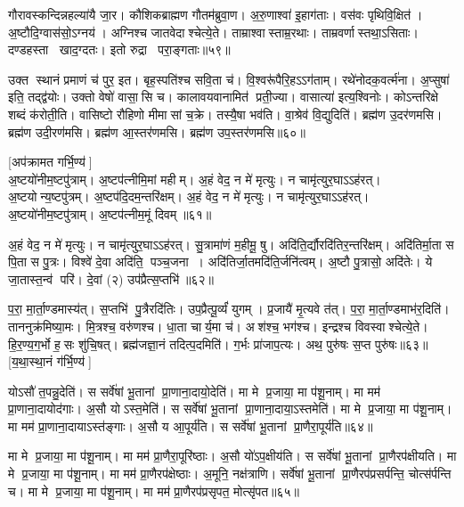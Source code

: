 गौरावस्कन्दिन्नहल्या॑यै जा॒र। कौशिकब्राह्मण गौतम॑ब्रुवा॒ण। 
अ॒रु॒णाश्वा॑ इ॒हाग॑ताः। वस॑वः पृथिवि॒क्षित॑। 
अ॒ष्टौदि॒ग्वास॑सो॒ऽग्नय॑। अग्निश्च जातवेदाश्चेत्ये॒ते। 
ताम्राश्वास्ताम्र॒रथाः। ताम्रवर्णास्तथा॒\-ऽसिताः। 
दण्डहस्ता खाद॒ग्दतः। इतो रुद्रा परा॒ङ्गताः॥५९॥


उक्त स्थानं प्रमाणं च॑ पुर॒ इत। बृह॒स्पति॑श्च सवि॒ता च॑। 
वि॒श्वरू॑पैरि॒हऽऽग॑ताम्‌। रथे॑नोदक॒वर्त्म॑ना। 
अ॒प्सुषा॑ इति॒ तद्द्व॑योः। उक्तो वेषो॑ वासा॒सि च। 
कालावयवानामित॑ प्रती॒ज्या। वासात्या॑ इत्य॒श्विनोः। 
कोऽन्तरिक्षे शब्दं क॑रोती॒ति। वासिष्टो रौहिणो मीमासां च॒क्रे। 
तस्यै॒षा भव॑ति। वा॒श्रेव॑ वि॒द्युदिति॑। 
ब्रह्म॑ण उ॒दर॑णमसि। ब्रह्म॑ण उदी॒रण॑मसि। 
ब्रह्म॑ण आ॒स्तर॑णमसि। ब्रह्म॑ण उप॒स्तर॑णमसि॥६०॥\anuvakamend


[अप॑क्रामत गर्भि॒ण्य॑]\\
अ॒ष्टयो॑नीम॒ष्टपु॑त्राम्‌। अ॒ष्टप॑त्नीमि॒मां महीम्‌। 
अ॒हं वेद॒ न मे॑ मृत्युः। न चामृ॑त्युर॒घाऽऽह॑रत्‌। 
अ॒ष्टयोन्य॒ष्टपु॑त्रम्‌। अ॒ष्टप॑दि॒दम॒न्तरि॑क्षम्‌। 
अ॒हं वेद॒ न मे॑ मृत्युः। न चामृ॑त्युर॒घाऽऽह॑रत्‌। 
अ॒ष्टयो॑नीम॒ष्टपु॑त्राम्‌। अ॒ष्टप॑त्नीम॒मूं दिवम्‌॥६१॥


अ॒हं वेद॒ न मे॑ मृत्युः। न चामृ॑त्युर॒घाऽऽह॑रत्‌। 
सु॒त्रामा॑णं म॒हीमू॒ षु। अदि॑ति॒र्द्यौरदि॑तिर॒न्तरि॑क्षम्। 
अदि॑तिर्मा॒ता स पि॒ता स पु॒त्रः। विश्वे॑ दे॒वा अदि॑ति॒ पञ्च॒जना। 
अदि॑तिर्जा॒तमदि॑ति॒र्जनि॑त्वम्‌। अ॒ष्टौ पु॒त्रासो॒ अदि॑तेः। 
ये जा॒तास्त॒न्व॑ परि॑। दे॒वां (२) उप॑प्रैत्स॒प्तभि॑॥६२॥


प॒रा॒ मा॒र्ता॒ण्डमास्य॑त्‌। स॒प्तभि॑ पु॒त्रैरदि॑तिः। 
उप॒प्रैत्पू॒र्व्यं॑ युगम्। प्र॒जायै॑ मृ॒त्यवे त॑त्‌। 
प॒रा॒ मा॒र्ता॒ण्डमाभ॑र॒दिति॑। ताननुक्र॑मिष्या॒मः। 
मि॒त्रश्च॒ वरु॑णश्च। धा॒ता चार्य॒मा च॑। 
अश॑श्च॒ भग॑श्च। इन्द्रश्च विवस्वाश्चेत्ये॒ते। 
हि॒र॒ण्य॒ग॒र्भो ह॒सः शु॑चि॒षत्‌। 
ब्रह्म॑जज्ञा॒नं तदित्प॒दमिति॑। ग॒र्भः प्रा॑जाप॒त्यः। 
अथ॒ पुरु॑षः स॒प्त पुरु॑षः॥६३॥\\\mbox{}
[य॒था॒स्था॒नं ग॑र्भि॒ण्य॑]\anuvakamend

योऽसौ॑ त॒पन्नु॒देति॑। स सर्वे॑षां भू॒तानां प्रा॒णाना॒दायो॒देति॑। 
मा मे प्र॒जाया॒ मा प॑शू॒नाम्‌। मा मम॑ प्रा॒णाना॒दायोद॑गाः। 
अ॒सौ योऽस्त॒मेति॑। स सर्वे॑षां भू॒तानां प्रा॒णाना॒दाया॒ऽस्तमेति॑। 
मा मे प्र॒जाया॒ मा प॑शू॒नाम्‌। मा मम॑ प्रा॒णाना॒दायाऽस्त॑ङ्गाः। 
अ॒सौ य आ॒पूर्य॑ति। स सर्वे॑षां भू॒तानां प्रा॒णैरा॒पूर्य॑ति॥६४॥


मा मे प्र॒जाया॒ मा प॑शू॒नाम्‌। मा मम॑ प्रा॒णैरा॒पूरि॑ष्ठाः। 
अ॒सौ यो॑ऽप॒क्षीय॑ति। स सर्वे॑षां भू॒तानां प्रा॒णैरप॑क्षीयति। 
मा मे प्र॒जाया॒ मा प॑शू॒नाम्‌। मा मम॑ प्रा॒णैरप॑क्षेष्ठाः। 
अ॒मूनि॒ नक्ष॑त्राणि। सर्वे॑षां भू॒तानां प्रा॒णैरप॑प्रसर्पन्ति॒ चोत्स॑र्पन्ति च। 
मा मे प्र॒जाया॒ मा प॑शू॒नाम्‌। मा मम॑ प्रा॒णैरप॑प्रसृपत॒ मोत्सृ॑पत॥६५॥


